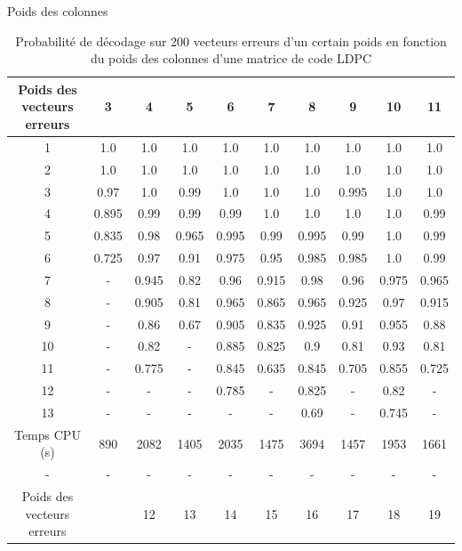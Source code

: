 \documentclass[french,nochapter,11pt]{rapportUB}
\begin{document}
\begin{table}[htbp]
  \centering
  \caption{Probabilité de décodage sur 200 vecteurs erreurs d'un certain poids en fonction du poids des colonnes d'une matrice de code LDPC}
  \vspace{0.3cm}\hspace{4.5cm} Poids des colonnes\vspace{0.1cm}
  \label{table:res2}
  \begin{tabular}{|c|c|c|c|c|c|c|c|c|c|}
          \hline
          Poids des vecteurs erreurs &3 &4 &5 &6 &7 &8 &9 &10 &11 \\
          \hline
          1 &1.0	&1.0	&1.0 &1.0	&1.0 &1.0	&1.0 &1.0 &1.0 \\
          \hline
          2 &1.0	&1.0	&1.0 &1.0	&1.0 &1.0	&1.0 &1.0 &1.0 \\
          \hline
          3 &0.97	&1.0 &0.99 &1.0 &1.0 &1.0 &0.995 &1.0 &1.0 \\
          \hline
          4 &0.895 &0.99 &0.99 &0.99 &1.0 &1.0 &1.0 &1.0 &0.99 \\
          \hline
          5	&0.835 &0.98 &0.965 &0.995 &0.99 &0.995 &0.99 &1.0 &0.99 \\
          \hline
          6	&0.725 &0.97 &0.91 &0.975 &0.95 &0.985 &0.985 &1.0 &0.99 \\
          \hline
          7	&- &0.945 &0.82 &0.96 &0.915 &0.98 &0.96 &0.975 &0.965 \\
          \hline
          8	&- &0.905 &0.81 &0.965 &0.865 &0.965 &0.925 &0.97 &0.915 \\
          \hline
          9	&- &0.86 &0.67 &0.905 &0.835 &0.925 &0.91 &0.955 &0.88 \\
          \hline
          10 &- &0.82 &- &0.885 &0.825 &0.9	&0.81	&0.93	&0.81 \\
          \hline
          11 &- &0.775 &-	&0.845 &0.635	&0.845 &0.705	&0.855 &0.725 \\
          \hline
          12 &- &- &- &0.785	&- &0.825 &- &0.82 &- \\
          \hline
          13 &- &- &- &- &- &0.69 &- &0.745	&- \\
          \hline
          Temps CPU (s) &890 &2082 &1405 &2035 &1475 &3694 &1457 &1953 &1661\\
          \hline
          - &- &- &- &- &- &- &- &- &-\\
          \hline
          Poids des vecteurs erreurs &\phantom &12 &13 &14 &15 &16 &17 &18 &19 \\
          \hline

\end{tabular}
\end{table}
\end{document}
